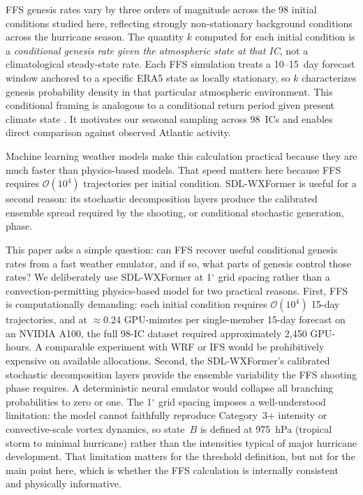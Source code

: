 \documentclass[11pt]{article}
\begin{document}
FFS genesis rates vary by three orders of magnitude across the 98 initial conditions studied here, reflecting strongly non-stationary
background conditions across the hurricane season. The quantity $k$ computed for each initial condition is a \textit{conditional genesis rate given the atmospheric state at that IC}, not a climatological steady-state rate. Each FFS simulation treats a
10--15~day forecast window anchored to a specific ERA5 state as locally stationary, so $k$ characterizes genesis probability density in that particular atmospheric environment. This conditional framing is analogous to a conditional return period
given present climate state \citep{finkel2023revealing, finkel2024bringing}. It motivates our seasonal sampling across 98~ICs and enables direct comparison against observed
Atlantic activity.

Machine learning weather models \citep{lam2023graphcast, bi2023pangu, pathak2022fourcastnet}
make this calculation practical because they are much faster than physics-based models. That speed matters here because FFS requires $\mathcal{O}(10^4)$ trajectories per initial condition. SDL-WXFormer \citep{schreck2025sdl} is useful for a second reason: its stochastic decomposition layers produce the calibrated ensemble spread required by the shooting, or conditional stochastic generation, phase. 

This paper asks a simple question: can FFS recover useful conditional genesis rates from a fast weather emulator, and if so, what parts of genesis control those rates? We deliberately use SDL-WXFormer at 1$^\circ$ grid spacing rather than a convection-permitting physics-based model for two practical reasons. First, FFS is computationally demanding: each initial condition requires $\mathcal{O}(10^4)$ 15-day trajectories, and at $\approx$0.24 GPU-minutes per single-member 15-day forecast on an NVIDIA A100, the full 98-IC dataset required approximately 2,450 GPU-hours. A comparable experiment with WRF or IFS would be prohibitively expensive on available allocations. Second, the SDL-WXFormer's calibrated stochastic decomposition layers provide the ensemble variability the FFS shooting phase requires. A deterministic neural emulator would collapse all branching probabilities to zero or one. The 1$^\circ$ grid spacing imposes a well-understood limitation: the model cannot faithfully reproduce Category~3+ intensity or convective-scale vortex dynamics, so state~$B$ is defined at 975~hPa (tropical storm to minimal hurricane) rather than the intensities typical of major hurricane development. That limitation matters for the threshold definition, but not for the main point here, which is whether the FFS calculation is internally consistent and physically informative.
\end{document}
